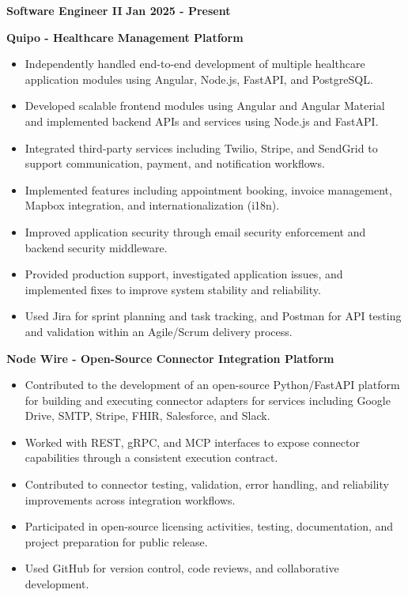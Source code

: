 \documentclass[10pt,a4paper]{article}
\begin{document}
\textbf{Software Engineer II} \hfill \textbf{Jan 2025 - Present}

\textbf{Quipo - Healthcare Management Platform}

\begin{itemize}
    \item Independently handled end-to-end development of multiple healthcare application modules using Angular, Node.js, FastAPI, and PostgreSQL.
    
    \item Developed scalable frontend modules using Angular and Angular Material and implemented backend APIs and services using Node.js and FastAPI.
    
    \item Integrated third-party services including Twilio, Stripe, and SendGrid to support communication, payment, and notification workflows.
    
    \item Implemented features including appointment booking, invoice management, Mapbox integration, and internationalization (i18n).
    
    \item Improved application security through email security enforcement and backend security middleware.
    
    \item Provided production support, investigated application issues, and implemented fixes to improve system stability and reliability.

    \item Used Jira for sprint planning and task tracking, and Postman for API testing and validation within an Agile/Scrum delivery process.
\end{itemize}

\textbf{Node Wire - Open-Source Connector Integration Platform}

\begin{itemize}
    \item Contributed to the development of an open-source Python/FastAPI platform for building and executing connector adapters for services including Google Drive, SMTP, Stripe, FHIR, Salesforce, and Slack.
    
    \item Worked with REST, gRPC, and MCP interfaces to expose connector capabilities through a consistent execution contract.
    
    \item Contributed to connector testing, validation, error handling, and reliability improvements across integration workflows.
    
    \item Participated in open-source licensing activities, testing, documentation, and project preparation for public release.
    
    \item Used GitHub for version control, code reviews, and collaborative development.
\end{itemize}
\end{document}

